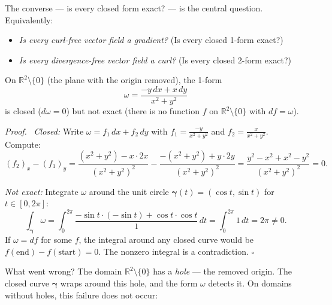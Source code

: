 \documentclass[11pt]{report}
\renewenvironment{proof}[1][Proof]{\par\noindent\textit{#1.}\ }{\hfill$\square$\par\medskip}
\newcommand{\R}{\mathbb{R}}
\begin{document}
The converse --- is every closed form exact? --- is the central question. Equivalently:
\begin{itemize}
    \item \textit{Is every curl-free vector field a gradient?} (Is every closed 1-form exact?)
    \item \textit{Is every divergence-free vector field a curl?} (Is every closed 2-form exact?)
\end{itemize}

\begin{proposition}
On $\R^2 \setminus \{0\}$ (the plane with the origin removed), the 1-form
\[
\omega = \frac{-y\,dx + x\,dy}{x^2 + y^2}
\]
is closed ($d\omega = 0$) but not exact (there is no function $f$ on $\R^2 \setminus \{0\}$ with $df = \omega$).
\end{proposition}

\begin{proof}
\textit{Closed:} Write $\omega = f_1\,dx + f_2\,dy$ with $f_1 = \frac{-y}{x^2+y^2}$ and $f_2 = \frac{x}{x^2+y^2}$. Compute:
\[
(f_2)_x - (f_1)_y = \frac{(x^2+y^2) - x \cdot 2x}{(x^2+y^2)^2} - \frac{-(x^2+y^2) + y \cdot 2y}{(x^2+y^2)^2} = \frac{y^2 - x^2 + x^2 - y^2}{(x^2+y^2)^2} = 0.
\]

\textit{Not exact:} Integrate $\omega$ around the unit circle $\boldsymbol{\gamma}(t) = (\cos t, \sin t)$ for $t \in [0, 2\pi]$:
\[
\int_{\boldsymbol{\gamma}} \omega = \int_0^{2\pi} \frac{-\sin t \cdot (-\sin t) + \cos t \cdot \cos t}{1}\,dt = \int_0^{2\pi} 1\,dt = 2\pi \neq 0.
\]
If $\omega = df$ for some $f$, the integral around any closed curve would be $f(\text{end}) - f(\text{start}) = 0$. The nonzero integral is a contradiction.
\end{proof}

What went wrong? The domain $\R^2 \setminus \{0\}$ has a \textit{hole} --- the removed origin. The closed curve $\boldsymbol{\gamma}$ wraps around this hole, and the form $\omega$ detects it. On domains without holes, this failure does not occur:
\end{document}
